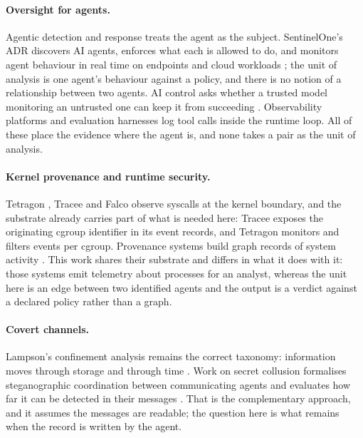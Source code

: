 \documentclass[11pt]{article}
\begin{document}
\paragraph{Oversight for agents.} Agentic detection and response treats the agent as
the subject. SentinelOne's ADR discovers AI agents, enforces what each is allowed to
do, and monitors agent behaviour in real time on endpoints and cloud workloads
\cite{sentinelone2026adr}; the unit of analysis is one agent's behaviour against a
policy, and there is no notion of a relationship between two agents. AI control asks
whether a trusted model monitoring an untrusted one can keep it from succeeding
\cite{greenblatt2024control}. Observability platforms and evaluation harnesses log
tool calls inside the runtime loop. All of these place the evidence where the agent
is, and none takes a pair as the unit of analysis.

\paragraph{Kernel provenance and runtime security.} Tetragon \cite{tetragon}, Tracee
\cite{tracee} and Falco \cite{falco} observe syscalls at the kernel boundary, and the
substrate already carries part of what is needed here: Tracee exposes the originating
cgroup identifier in its event records, and Tetragon monitors and filters events per
cgroup. Provenance systems build graph records of system
activity \cite{spade,camflow,nodoze}. This work shares their substrate and differs in
what it does with it: those systems emit telemetry about processes for an analyst,
whereas the unit here is an edge between two identified agents and the output is a
verdict against a declared policy rather than a graph.

\paragraph{Covert channels.} Lampson's confinement analysis remains the correct
taxonomy: information moves through storage and through time \cite{lampson1973}. Work on secret collusion formalises steganographic coordination between communicating agents and evaluates how far it can be detected in their messages \cite{motwani2024secret}. That is the complementary approach, and it assumes the messages are readable; the question here is what remains when the record is written by the agent.
\end{document}
